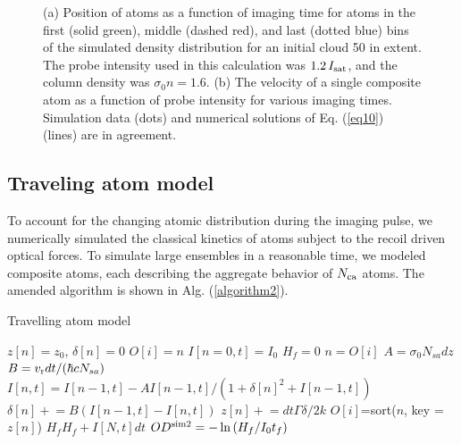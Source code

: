 \documentclass[12pt]{iopart}
\begin{document}
\begin{figure}
\caption{(a) Position of atoms as a function of imaging time for atoms in the first (solid green), middle (dashed red), and last (dotted blue) bins of the simulated density distribution for an initial cloud 50 \um{} in extent. The probe intensity used in this calculation was $1.2\, I_{\rm{sat}}$, and the column density was $\sigma_0 n=1.6$. (b) The velocity of a single composite atom as a function of probe intensity for various imaging times. Simulation data (dots) and numerical  solutions of Eq. (\ref{eq10}) (lines) are in agreement.}
\label{fig:simTests}
\end{figure}

\subsection{Traveling atom model}
To account for the changing atomic distribution during the imaging pulse, we numerically simulated the classical kinetics of atoms subject to the recoil driven optical forces. To simulate large ensembles in a reasonable time, we modeled composite atoms, each describing the aggregate behavior of $N_{\rm{ca}}$ atoms. The amended algorithm is shown in Alg. (\ref{algorithm2}).
\begin{algorithm}
\caption{Travelling atom model}
\label{algorithm2}
\begin{algorithmic}
\STATE $z[n]=z_0$, $\delta[n]=0$ 
\STATE $O[i]=n$ 
\STATE $I[n=0,t]=I_0$ 
\STATE $H_f=0$ 
\STATE $n=O[i]$ 
 \STATE $A=\sigma_0 N_{sa} dz$ 
 \STATE $B=v_{\rm{r}} dt/(\hbar c  N_{sa})$  
\STATE $I[n,t]=I[n-1,t] - A I[n-1,t]/(1+\delta[n]^2+I[n-1,t])$  
\STATE $\delta[n]\mathrel{+}=B\left(I[n-1,t]-I[n,t]\right)$  
\STATE $z[n]\mathrel{+}=dt\Gamma\delta/2k$ 
\ENDFOR
\STATE $O[i]$=sort($n$, key =$z[n]$) 
\STATE $H_f H_f+ I[N,t]dt$ 
\ENDFOR
\STATE $OD^{\rm{sim2}}=-\ln{(H_f/I_0t_f)}$
\end{algorithmic}
\end{algorithm}
\end{document}
